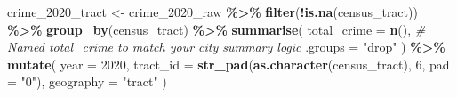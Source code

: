 \documentclass[
]{article}
\newenvironment{Shaded}{\begin{snugshade}}{\end{snugshade}}
\newcommand{\AttributeTok}[1]{\textcolor[rgb]{0.13,0.29,0.53}{#1}}
\newcommand{\CommentTok}[1]{\textcolor[rgb]{0.56,0.35,0.01}{\textit{#1}}}
\newcommand{\DecValTok}[1]{\textcolor[rgb]{0.00,0.00,0.81}{#1}}
\newcommand{\FunctionTok}[1]{\textcolor[rgb]{0.13,0.29,0.53}{\textbf{#1}}}
\newcommand{\NormalTok}[1]{#1}
\newcommand{\OtherTok}[1]{\textcolor[rgb]{0.56,0.35,0.01}{#1}}
\newcommand{\SpecialCharTok}[1]{\textcolor[rgb]{0.81,0.36,0.00}{\textbf{#1}}}
\newcommand{\StringTok}[1]{\textcolor[rgb]{0.31,0.60,0.02}{#1}}
\begin{document}
\begin{Shaded}
\begin{Highlighting}[]
\NormalTok{crime\_2020\_tract }\OtherTok{\textless{}{-}}\NormalTok{ crime\_2020\_raw }\SpecialCharTok{\%\textgreater{}\%}
  \FunctionTok{filter}\NormalTok{(}\SpecialCharTok{!}\FunctionTok{is.na}\NormalTok{(census\_tract)) }\SpecialCharTok{\%\textgreater{}\%}
  \FunctionTok{group\_by}\NormalTok{(census\_tract) }\SpecialCharTok{\%\textgreater{}\%}
  \FunctionTok{summarise}\NormalTok{(}
    \AttributeTok{total\_crime =} \FunctionTok{n}\NormalTok{(),  }\CommentTok{\# Named \textquotesingle{}total\_crime\textquotesingle{} to match your city summary logic}
    \AttributeTok{.groups =} \StringTok{"drop"}
\NormalTok{  ) }\SpecialCharTok{\%\textgreater{}\%}
  \FunctionTok{mutate}\NormalTok{(}
    \AttributeTok{year =} \DecValTok{2020}\NormalTok{,}
    \AttributeTok{tract\_id =} \FunctionTok{str\_pad}\NormalTok{(}\FunctionTok{as.character}\NormalTok{(census\_tract), }\DecValTok{6}\NormalTok{, }\AttributeTok{pad =} \StringTok{"0"}\NormalTok{),}
    \AttributeTok{geography =} \StringTok{"tract"}
\NormalTok{  )}
\end{Highlighting}
\end{Shaded}
\end{document}
